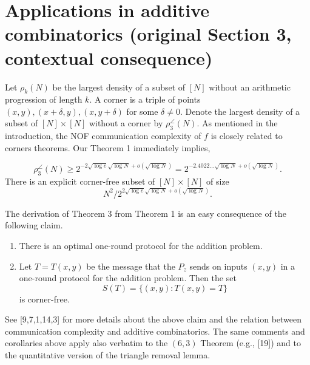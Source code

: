 \section*{Applications in additive combinatorics (original Section 3, contextual consequence)}
Let $\rho_k(N)$ be the largest density of a subset of $[N]$ without an arithmetic progression of length $k$. A corner is a triple of points $(x,y),(x+\delta,y),(x,y+\delta)$ for some $\delta\ne0$. Denote the largest density of a subset of $[N]\times[N]$ without a corner by $\rho_3^\angle(N)$.
As mentioned in the introduction, the NOF communication complexity of $f$ is closely related to corners theorems. Our Theorem 1 immediately implies,
\begin{theorem}
\[\rho_3^\angle(N)\ge2^{-2\sqrt{\log e}\sqrt{\log N}+o(\sqrt{\log N})}=2^{-2.4022\ldots\sqrt{\log N}+o(\sqrt{\log N})}.\]
There is an explicit corner-free subset of $[N]\times[N]$ of size
\[N^2/2^{2\sqrt{\log e}\sqrt{\log N}+o(\sqrt{\log N})}.\]
\end{theorem}
The derivation of Theorem 3 from Theorem 1 is an easy consequence of the following claim.
\begin{claim}[{[9], implicit}]
\begin{enumerate}
\item There is an optimal one-round protocol for the addition problem.
\item Let $T=T(x,y)$ be the message that the $P_z$ sends on inputs $(x,y)$ in a one-round protocol for the addition problem. Then the set
\[S(T)=\{(x,y):T(x,y)=T\}\]
is corner-free.
\end{enumerate}
\end{claim}
See [9,7,1,14,3] for more details about the above claim and the relation between communication complexity and additive combinatorics. The same comments and corollaries above apply also verbatim to the $(6,3)$ Theorem (e.g., [19]) and to the quantitative version of the triangle removal lemma.
